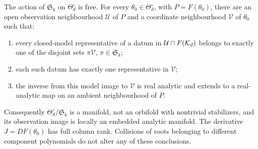 \begin{theorem}\label{thm:quotient-chart}
The action of $\mathfrak S_k$ on $\Theta^\circ_d$ is free. For every
$\theta_0\in\Theta^\circ_d$, with $P=F(\theta_0)$, there are an open
observation neighbourhood $\mathcal U$ of $P$ and a coordinate
neighbourhood $\mathcal V$ of $\theta_0$ such that:
\begin{enumerate}
\item every closed-model representative of a datum in
$\mathcal U\cap F(\mathcal K_d)$ belongs to exactly one of the disjoint sets
$\pi\mathcal V$, $\pi\in\mathfrak S_k$;
\item each such datum has exactly one representative in $\mathcal V$;
\item the inverse from this model image to $\mathcal V$ is real analytic
and extends to a real-analytic map on an ambient neighbourhood of $P$.
\end{enumerate}
Consequently $\Theta^\circ_d/\mathfrak S_k$ is a manifold, not an
orbifold with nontrivial stabilizers, and its observation image is
locally an embedded analytic manifold. The derivative $J=DF(\theta_0)$
has full column rank. Collisions of roots belonging to different
component polynomials do not alter any of these conclusions.
\end{theorem}
